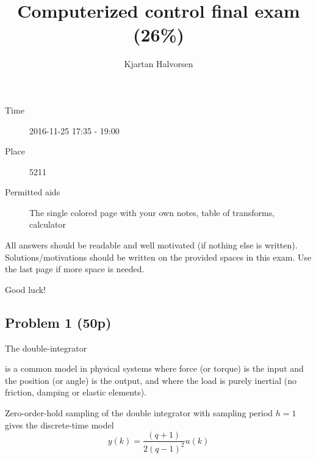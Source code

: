 \documentclass[letter,12pt]{article}
\title{Computerized control final exam (26\%)}
\author{Kjartan Halvorsen}
\newcommand{\bmpl}{\begin{minipage}[t]{\textwidth}}
\newcommand{\emp}{\end{minipage}}
\begin{document}
\maketitle


\begin{description}
\item[Time] 2016-11-25 17:35 - 19:00
\item[Place] 5211
\item[Permitted aids] The single colored page with your own notes, table of transforms, calculator
\end{description}

All answers should be readable and well motivated (if nothing else is written). Solutions/motivations should be written on the provided spaces in this exam. Use the last page if more space is needed.

\begin{center}
{\Large Good luck!} \\
\end{center}

\noindent
\fbox{
\bmpl
{\bf Matricula and name:}\\
\vspace*{30mm}
\emp}

\clearpage



\subsection*{Problem 1 (50p)}
The double-integrator
\begin{center}
\end{center}
is a common model in physical systems where force (or torque) is the input and the position (or angle) is the output, and where the load is purely inertial (no friction, damping or elastic elements).

Zero-order-hold sampling of the double integrator with sampling period $h=1$ gives the discrete-time model
\begin{equation}
 y(k) = \frac{(q+1)}{2(q-1)^2} u(k) 
\label{eq:doubleint}
\end{equation}
\end{document}

